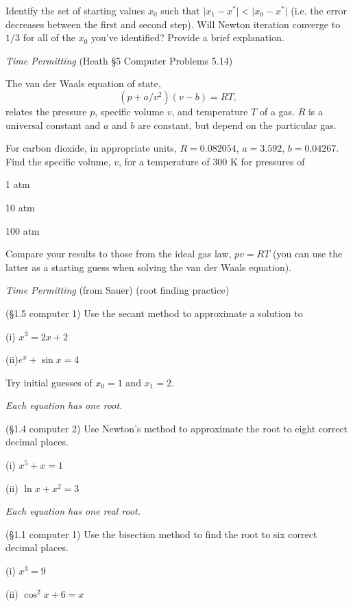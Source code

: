 \documentclass[12pt,letterpaper,noanswers]{exam}
\begin{document}
\begin{questions}
Identify the set of starting values $x_0$ such that $\vert x_1 - x^*\vert < \vert x_0 - x^*\vert$ (i.e. the error decreases between the first and second step).  Will Newton iteration converge to $1/3$ for all of the $x_0$ you've identified?  Provide a brief explanation.

\item \emph{Time Permitting} (Heath \S5 Computer Problems 5.14)

The van der Waals equation of state, \[\left(p+a/v^2\right)(v-b) = RT,\]
relates the pressure $p$, specific volume $v$, and temperature $T$ of a gas.  $R$ is a universal constant and $a$ and $b$ are constant, but depend on the particular gas.

For carbon dioxide, in appropriate units, $R = 0.082054$, $a = 3.592$, $b = 0.04267$.  Find the specific volume, $v$, for a temperature of $300$ K for pressures of 
\begin{parts}
\item 1 atm
\item 10 atm
\item 100 atm
\end{parts}
Compare your results to those from the ideal gas law, $pv = RT$ (you can use the latter as a starting guess when solving the van der Waals equation).

\item \emph{Time Permitting} (from Sauer) (root finding practice)
\begin{parts}
\item (\S1.5 computer 1) Use the secant method to approximate a solution to 

(i) $x^3=2x+2$

(ii)$e^x +\sin x=4$

Try initial guesses of $x_0=1$ and $x_1=2$.

\emph{Each equation has one root.}

\item (\S1.4 computer 2) Use Newton's method to approximate the root to eight correct decimal places.

(i) $x^5 + x = 1$

(ii) $\ln x + x^2 = 3$

\emph{Each equation has one real root.}

\item (\S 1.1 computer 1) Use the bisection method to find the root to six correct decimal places.

(i) $x^3 = 9$

(ii) $\cos^2 x + 6 = x$
\end{parts}


\end{questions}



\end{document}

